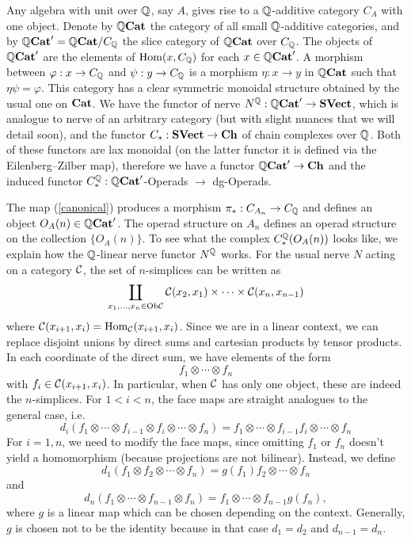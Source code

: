 \documentclass[TFM.tex]{subfiles}
\begin{document}
Any algebra with unit over $\mathbb{Q}$, say $A$, gives rise to a $\mathbb{Q}$-additive category $C_A$ with one object. Denote by $\mathbb{Q}\mathrm{\mathbf{Cat}}$ the category of all small $\mathbb{Q}$-additive categories, and by $\mathbb{Q}\mathrm{\mathbf{Cat}}'=\mathbb{Q}\mathrm{\mathbf{Cat}}/C_{\mathbb{Q}}$ the slice category of $\mathbb{Q}\mathrm{\mathbf{Cat}}$ over $C_{\mathbb{Q}}$. The objects of $\mathbb{Q}\mathrm{\mathbf{Cat}}'$ are the elements of $\operatorname{Hom}(x, C_{\mathbb{Q}})$ for each $x\in \mathbb{Q}\mathrm{\mathbf{Cat}}'$. A morphism between $\varphi:x\to C_{\mathbb{Q}}$ and $\psi:y\to C_{\mathbb{Q}}$ is a morphism $\eta: x\to y$ in $\mathbb{Q}\mathrm{\mathbf{Cat}}$ such that $\eta\psi=\varphi$.  This category has a clear symmetric monoidal structure obtained by the usual one on $\mathrm{\mathbf{Cat}}$. We have the functor of nerve
$N^{\mathbb{Q}}: \mathbb{Q}\mathrm{\mathbf{Cat}}'\to \mathrm{\mathbf{SVect}}$, which is analogue to nerve of an arbitrary
category (but with slight nuances that we will detail soon), and the functor $C_*: \mathrm{\mathbf{SVect}} \to\mathrm{\mathbf{Ch}}$ of chain complexes over $\mathbb{Q}$. Both of these functors are lax monoidal (on the latter functor it is defined via the Eilenberg–Zilber map), therefore we have a functor $\mathbb{Q}\mathrm{\mathbf{Cat}}'\to\mathrm{\mathbf{Ch}}$ and the induced functor $C_*^{\mathbb{Q}}:\mathbb{Q}\mathrm{\mathbf{Cat}}'$-Operads $\to$ dg-Operads. 

The map (\ref{canonical}) produces a morphism $\pi_*: C_{A_n}\to C_{\mathbb{Q}}$ and defines an object
$O_A(n)\in \mathbb{Q}\mathrm{\mathbf{Cat}}'$. The operad structure on $A_n$ defines an operad structure on the
collection $\{O_A(n)\}$. 
To see what the complex $C_*^{\mathbb{Q}}(O_A(n))$ looks like, we explain how the $\mathbb{Q}$-linear nerve functor $N^{\mathbb{Q}}$ works. For the usual nerve $N$ acting on a category $\mathcal{C}$, the set of $n$-simplices can be written as
\[
\coprod_{x_1,\dots, x_n\in\mathrm{Ob}\mathcal{C}}\mathcal{C}(x_2,x_1)\times\cdots \times\mathcal{C}(x_n,x_{n-1})
\]
where $\mathcal{C}(x_{i+1},x_i)=\operatorname{Hom}_{\mathcal{C}}(x_{i+1},x_i)$. Since we are in a linear context, we can replace disjoint unions by direct sums and cartesian products by tensor products. In each coordinate of the direct sum, we have elements of the form
\[
f_1\otimes\cdots \otimes f_n
\]
with $f_i\in \mathcal{C}(x_{i+1},x_i)$. In particular, when $\mathcal{C}$ has only one object, these are indeed the $n$-simplices. For $1<i<n$, the face maps are straight analogues to the general case, i.e. $$d_i(f_1\otimes\cdots \otimes f_{i-1}\otimes f_i\otimes \cdots\otimes f_n)=f_1\otimes\cdots \otimes f_{i-1}f_i\otimes\cdots \otimes f_n$$
For $i=1,n$, we need to modify the face maps, since omitting $f_1$ or $f_n$ doesn't yield a homomorphism (because projections are not bilinear). Instead, we define
\[
d_1(f_1\otimes f_2\otimes\cdots\otimes f_n)=g(f_1)f_2\otimes\cdots\otimes f_n
\]
and
\[
d_n(f_1\otimes\cdots\otimes f_{n-1}\otimes f_n)=f_1\otimes\cdots\otimes f_{n-1} g(f_n),
\]
where $g$ is a linear map which can be chosen depending on the context. Generally, $g$ is chosen not to be the identity because in that case $d_1=d_2$ and $d_{n-1}=d_n$. 
\end{document}
